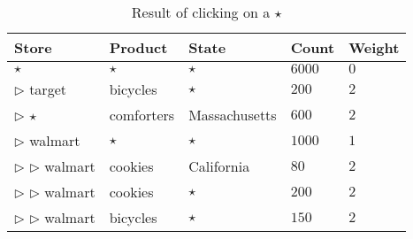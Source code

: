 \begin{table}
\centering
\begin{tabular}{| l | l | l | l | l |}
\hline Store & Product & State & Count & Weight \\
\hline
$\star$ & $\star$ & $\star$ & $6000$ & $0$ \\ \cline{1-5}
$\triangleright$ target & bicycles & $\star$ & $200$ & $2$ \\ \cline{1-5}
$\triangleright$ $\star$ & comforters & Massachusetts & $600$ & $2$ \\ \cline{1-5}
$\triangleright$ walmart & $\star$ & $\star$ & $1000$ & $1$ \\ \cline{2-5}
$\triangleright$ $\triangleright$ walmart & cookies & California & $80$ & $2$ \\ \cline{2-5}
$\triangleright$ $\triangleright$ walmart & cookies & $\star$ & $200$ & $2$ \\ \cline{2-5}
$\triangleright$ $\triangleright$ walmart & bicycles & $\star$ & $150$ & $2$ \\  \hline
\end{tabular}
\caption{Result of clicking on a $\star$ \label{table:introexample3}}
\end{table}


